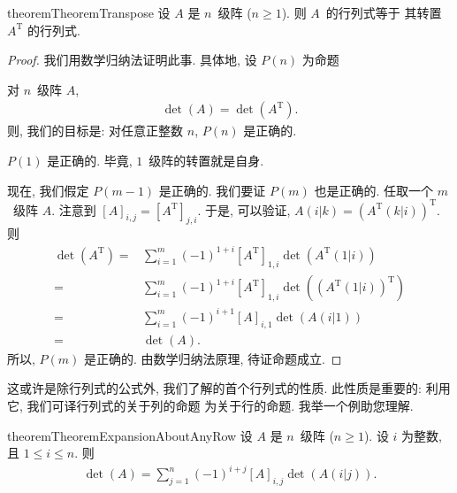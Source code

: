 \documentclass[%
    UTF8,%
    fontset=none,%
    punct=kaiming,%
    zihao=-4,%
    a4paper,%
    oneside,%
]{ctexbook}
\makeatletter
\let\emph\relax
\renewcommand*{\leq}{\leqslant}
\renewcommand*{\geq}{\geqslant}
\renewenvironment{quotation}
{\list{}{\listparindent 2\ccwd%
\itemindent\listparindent
\leftmargin\rightmargin
\parsep\z@ \@plus\p@}%
\item\relax}
{\endlist}
\makeatother
\begin{document}
\begin{restatable}[]{theorem}{TheoremTranspose}
    设 \(A\) 是 \(n\)~级阵 (\(n \geq 1\)).
    则 \(A\)~的行列式等于%
    其转置 \(A^{\mathrm{T}}\) 的行列式.
\end{restatable}

\begin{proof}
    我们用数学归纳法证明此事.
    具体地, 设 \(P(n)\) 为命题
    \begin{quotation}
        对\emph{任何} \(n\)~级阵 \(A\),
        \begin{align*}
            \det {(A)} = \det {(A^{\mathrm{T}})}.
        \end{align*}
    \end{quotation}
    则, 我们的目标是:
    对任意正整数 \(n\), \(P(n)\) 是正确的.

    \(P(1)\) 是正确的.
    毕竟, \(1\)~级阵的转置就是自身.

    现在, 我们假定 \(P(m-1)\) 是正确的.
    我们要证 \(P(m)\) 也是正确的.
    任取一个 \(m\)~级阵 \(A\).
    注意到 \([A]_{i,j} = [A^{\mathrm{T}}]_{j,i}\).
    于是, 可以验证,
    \(A(i|k) = (A^{\mathrm{T}}(k|i))^{\mathrm{T}}\).
    则
    \begin{align*}
        \det {(A^{\mathrm{T}})}
        = {} & \sum_{i = 1}^{m} {
        (-1)^{1+i} [A^{\mathrm{T}}]_{1,i}
        \det {(A^{\mathrm{T}}(1|i))}
        }
        \\
        = {} & \sum_{i = 1}^{m} {
        (-1)^{1+i} [A^{\mathrm{T}}]_{1,i}
        \det {((A^{\mathrm{T}}(1|i))^{\mathrm{T}})}
        }
        \\
        = {} & \sum_{i = 1}^{m} {
        (-1)^{i+1} [A]_{i,1}
        \det {(A(i|1))}
        }
        \\
        = {} & \det {(A)}.
    \end{align*}
    所以, \(P(m)\) 是正确的.
    由数学归纳法原理, 待证命题成立.
\end{proof}

这或许是除行列式的公式外,
我们了解的首个行列式的性质.
此性质是重要的:
利用它,
我们可译行列式的关于列的命题%
为关于行的命题.
我举一个例助您理解.

\begin{restatable}[]{theorem}{TheoremExpansionAboutAnyRow}
    设 \(A\) 是 \(n\)~级阵 (\(n \geq 1\)).
    设 \(i\) 为整数, 且 \(1 \leq i \leq n\).
    则
    \begin{align*}
        \det {(A)} = \sum_{j = 1}^{n}
        {(-1)^{i+j} [A]_{i,j} \det {(A(i|j))}}.
    \end{align*}
\end{restatable}
\end{document}
